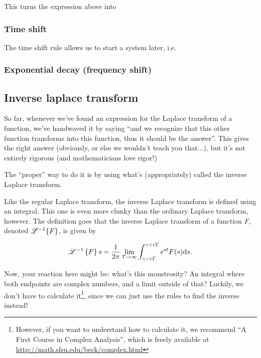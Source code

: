 This turns the expression above into

\subsubsection{Time shift}
The time shift rule allows us to start a system later, i.e. 
\subsubsection{Exponential decay (frequency shift)}\label{sec:decay}
\subsection{Inverse laplace transform}

So far, whenever we've found an expression for the Laplace transform of a function, we've handwaved it by saying ``and we recognize that this other function transforms into this function, thus it should be the answer''. This gives the right answer (obviously, or else we wouldn't teach you that...), but it's not entirely rigorous (and mathematicians love rigor!)

The ``proper'' way to do it is by using what's (appropriately) called the inverse Laplace transform.

Like the regular Laplace transform, the inverse Laplace transform is defined using an integral. This one is even more clunky than the ordinary Laplace transform, however. The definition goes that the inverse Laplace transform of a function $F$, denoted $\mathscr{L}^{-1}\{F\}$,  is given by

\begin{equation*}
    \mathscr{L}^{-1} \left\{F\right\} s = \frac{1}{2\pi} \lim_{T\to\infty} \int_{\gamma - iT}^{\gamma + iT} e^{st} F(s) \dd s.
\end{equation*}

Now, your reaction here might be: what's this monstrosity? An integral where both endpoints are complex numbers, and a limit outside of that? Luckily, we don't have to calculate it\footnote{However, if you want to understand how to calculate it, we recommend ``A First Course in Complex Analysis'', which is freely available at \url{http://math.sfsu.edu/beck/complex.html}}, since we can just use the rules to find the inverse instead! 



